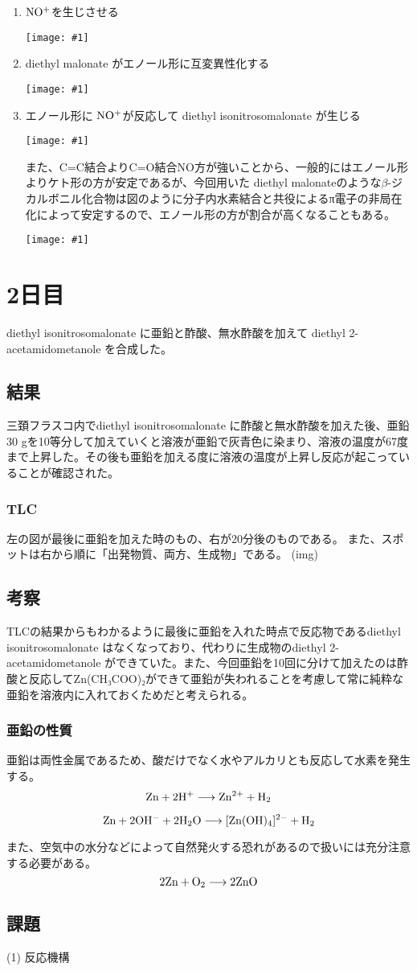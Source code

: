 \documentclass[a4paper,papersize,dvipdfmx]{jsarticle}
\newcommand{\pict}[2]{\begin{center} \texttt{[image: \#1]} \end{center}}   %
\begin{document}
\begin{enumerate}
\item $\rm NO^+$を生じさせる
\pict{imgs1/hk1.jpeg}{10}
\item diethyl malonate がエノール形に互変異性化する
\pict{imgs1/hk2.jpeg}{12}
\item エノール形に $\rm NO^+$が反応して diethyl isonitrosomalonate が生じる
\pict{imgs1/hk3.jpeg}{12}

また、C=C結合よりC=O結合NO方が強いことから、一般的にはエノール形よりケト形の方が安定であるが、今回用いた diethyl malonateのような$\beta$-ジカルボニル化合物は図のように分子内水素結合と共役によるπ電子の非局在化によって安定するので、エノール形の方が割合が高くなることもある。
\pict{imgs1/bck.jpeg}{7}
\end{enumerate}


\section*{2日目}
diethyl isonitrosomalonate に亜鉛と酢酸、無水酢酸を加えて diethyl 2-acetamidometanole を合成した。

\subsection*{結果}
三頚フラスコ内でdiethyl isonitrosomalonate に酢酸と無水酢酸を加えた後、亜鉛30 gを10等分して加えていくと溶液が亜鉛で灰青色に染まり、溶液の温度が67度まで上昇した。その後も亜鉛を加える度に溶液の温度が上昇し反応が起こっていることが確認された。

\subsubsection*{TLC}
左の図が最後に亜鉛を加えた時のもの、右が20分後のものである。
また、スポットは右から順に「出発物質、両方、生成物」である。
(img)

\subsection*{考察}
TLCの結果からもわかるように最後に亜鉛を入れた時点で反応物であるdiethyl isonitrosomalonate はなくなっており、代わりに生成物のdiethyl 2-acetamidometanole ができていた。また、今回亜鉛を10回に分けて加えたのは酢酸と反応してZn(CH₃COO)₂ができて亜鉛が失われることを考慮して常に純粋な亜鉛を溶液内に入れておくためだと考えられる。

\subsubsection*{亜鉛の性質}
亜鉛は両性金属であるため、酸だけでなく水やアルカリとも反応して水素を発生する。
\[\rm Zn + 2 H^+ \longrightarrow Zn^{2+} + H_2\]

\[\rm Zn + 2OH^-+ 2H_2O \longrightarrow [Zn(OH)_4]^{2-} + H_2\]

また、空気中の水分などによって自然発火する恐れがあるので扱いには充分注意する必要がある。
\[ \rm 2 Zn + O_2 \longrightarrow 2ZnO\]

\subsection*{課題}

(1) 反応機構
\end{document}
